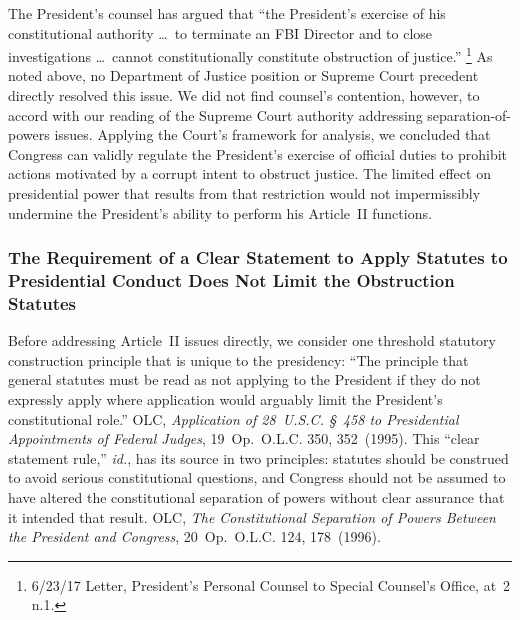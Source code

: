 The President's counsel has argued that ``the President's exercise of his constitutional authority \dots\ to terminate an FBI Director and to close investigations \dots\ cannot constitutionally constitute obstruction of justice.''%
\footnote{6/23/17 Letter, President's Personal Counsel to Special Counsel's Office, at~2 n.1.}
As noted above, no Department of Justice position or Supreme Court precedent directly resolved this issue.
We did not find counsel's contention, however, to accord with our reading of the Supreme Court authority addressing separation-of-powers issues.
Applying the Court's framework for analysis, we concluded that Congress can validly regulate the President's exercise of official duties to prohibit actions motivated by a corrupt intent to obstruct justice.
The limited effect on presidential power that results from that restriction would not impermissibly undermine the President's ability to perform his Article~II functions.

\subsubsection{The Requirement of a Clear Statement to Apply Statutes to Presidential Conduct Does Not Limit the Obstruction Statutes}

Before addressing Article~II issues directly, we consider one threshold statutory construction principle that is unique to the presidency: ``The principle that general statutes must be read as not applying to the President if they do not expressly apply where application would arguably limit the President's constitutional role.''
OLC, \textit{Application of 28~U.S.C. \S~458 to Presidential Appointments of Federal Judges}, 19~Op.\ O.L.C. 350, 352~(1995).
This ``clear statement rule,'' \textit{id.}, has its source in two principles: statutes should be construed to avoid serious constitutional questions, and Congress should not be assumed to have altered the constitutional separation of powers without clear assurance that it intended that result.
OLC, \textit{The Constitutional Separation of Powers Between the President and Congress}, 20~Op.\ O.L.C. 124, 178~(1996).

